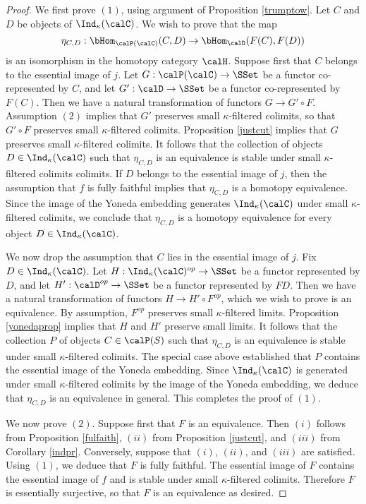 \begin{proof}
We first prove $(1)$, using argument of Proposition \ref{trumptow}. Let
$C$ and $D$ be objects of $\Ind_{\kappa}(\calC)$. 
We wish to prove that the map
$$ \eta_{C,D}: \bHom_{\calP(\calC)}(C,D) \rightarrow \bHom_{\calD}(F(C), F(D))$$ is an isomorphism in the homotopy category $\calH$. Suppose first that $C$ belongs to the essential image
of $j$. Let $G: \calP(\calC) \rightarrow \SSet$ be a functor co-represented by $C$, and let
$G': \calD \rightarrow \SSet$ be a functor co-represented by $F(C)$. Then we have a natural transformation of functors $G \rightarrow G' \circ F$. Assumption $(2)$ implies that $G'$ preserves small $\kappa$-filtered colimits, so that $G' \circ F$ preserves small $\kappa$-filtered colimits. 
Proposition \ref{justcut} implies that
$G$ preserves small $\kappa$-filtered colimits. It follows that the collection of objects $D \in \Ind_{\kappa}(\calC)$ such
that $\eta_{C,D}$ is an equivalence is stable under small $\kappa$-filtered colimits colimits. If $D$ belongs to the essential image of $j$, then the assumption that $f$ is fully faithful implies that $\eta_{C,D}$ is a homotopy equivalence. Since the image of the Yoneda embedding generates
$\Ind_{\kappa}(\calC)$ under small $\kappa$-filtered colimits, we conclude that $\eta_{C,D}$ is a homotopy equivalence for every object $D \in \Ind_{\kappa}(\calC)$.

We now drop the assumption that $C$ lies in the essential image of $j$. Fix $D \in \Ind_{\kappa}(\calC)$. Let $H: \Ind_{\kappa}(\calC)^{op} \rightarrow \SSet$
be a functor represented by $D$, and let $H': \calD^{op} \rightarrow \SSet$ be a functor represented by $FD$. Then we have a natural transformation of functors $H \rightarrow H' \circ F^{op}$, which we wish to prove is an equivalence. By assumption, $F^{op}$ preserves small $\kappa$-filtered limits. Proposition \ref{yonedaprop} implies that $H$ and $H'$ preserve small limits. It follows that the collection $P$ of objects $C \in \calP(S)$ such that $\eta_{C,D}$ is an equivalence is stable under small $\kappa$-filtered colimits.
The special case above established that $P$ contains the essential image of the Yoneda embedding. Since $\Ind_{\kappa}(\calC)$ is generated under small $\kappa$-filtered colimits by the image of the Yoneda embedding, we deduce that $\eta_{C,D}$ is an equivalence in general. This completes the proof of $(1)$.

We now prove $(2)$. Suppose first that $F$ is an equivalence. Then
$(i)$ follows from Proposition \ref{fulfaith}, $(ii)$ from Proposition \ref{justcut}, and $(iii)$ from Corollary \ref{indpr}. Conversely, suppose that $(i)$, $(ii)$, and $(iii)$ are satisfied. Using $(1)$, we deduce that $F$ is fully faithful. The essential image of $F$ contains the essential image of $f$ and is stable under small $\kappa$-filtered colimits. Therefore $F$ is essentially surjective, so that $F$ is an equivalence as desired.
\end{proof}

